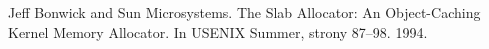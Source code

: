 \begin{thebibliography}{}
Jeff Bonwick and Sun Microsystems. The Slab Allocator: An Object-Caching Kernel Memory Allocator.
In USENIX Summer, strony 87--98. 1994.

\end{thebibliography}
